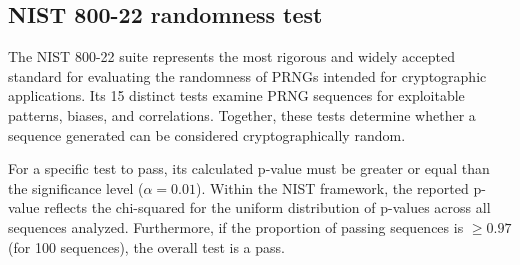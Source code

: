 \documentclass[preprint, 12pt, sort&compress]{elsarticle}
\begin{document}
\subsection{NIST 800-22 randomness test}
The NIST 800-22 suite \cite{bassham_statistical_2010} represents the most rigorous and widely accepted standard for evaluating the randomness of PRNGs intended for cryptographic applications. Its 15 distinct tests examine PRNG sequences for exploitable patterns, biases, and correlations. Together, these tests determine whether a sequence generated can be considered cryptographically random.

For a specific test to pass, its calculated p-value must be greater or equal than the significance level ($\alpha = 0.01$). Within the NIST framework, the reported p-value reflects the chi-squared for the uniform distribution of p-values across all sequences analyzed. Furthermore, if the proportion of passing sequences is $\geq 0.97$ (for 100 sequences), the overall test is a pass. 
\end{document}
